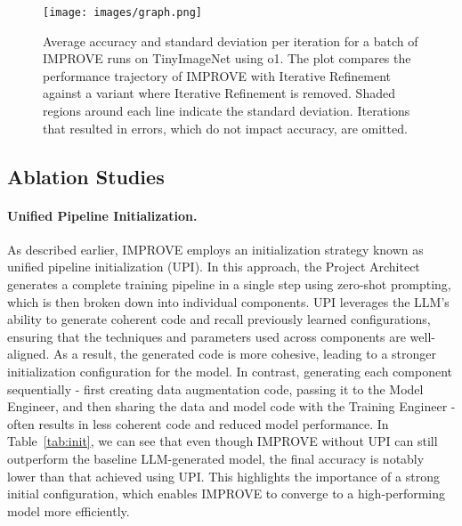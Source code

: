 \begin{figure}[ht] 
    \centering
    \texttt{[image: images/graph.png]} %
    \caption{Average accuracy and standard deviation per iteration for a batch of IMPROVE runs on TinyImageNet using o1. The plot compares the performance trajectory of IMPROVE with Iterative Refinement against a variant where Iterative Refinement is removed. Shaded regions around each line indicate the standard deviation. Iterations that resulted in errors, which do not impact accuracy, are omitted.}
    \label{fig:graph}
\end{figure}

\subsection{Ablation Studies}
\label{sec:ablation}
\paragraph{Unified Pipeline Initialization.} 
As described earlier, IMPROVE employs an initialization strategy known as unified pipeline initialization (UPI). In this approach, the Project Architect generates a complete training pipeline in a single step using zero-shot prompting, which is then broken down into individual components. UPI leverages the LLM's ability to generate coherent code and recall previously learned configurations, ensuring that the techniques and parameters used across components are well-aligned. As a result, the generated code is more cohesive, leading to a stronger initialization configuration for the model. In contrast, generating each component sequentially - first creating data augmentation code, passing it to the Model Engineer, and then sharing the data and model code with the Training Engineer - often results in less coherent code and reduced model performance. In Table~\ref{tab:init}, we can see that even though IMPROVE without UPI can still outperform the baseline LLM-generated model, the final accuracy is notably lower than that achieved using UPI. This highlights the importance of a strong initial configuration, which enables IMPROVE to converge to a high-performing model more efficiently.

